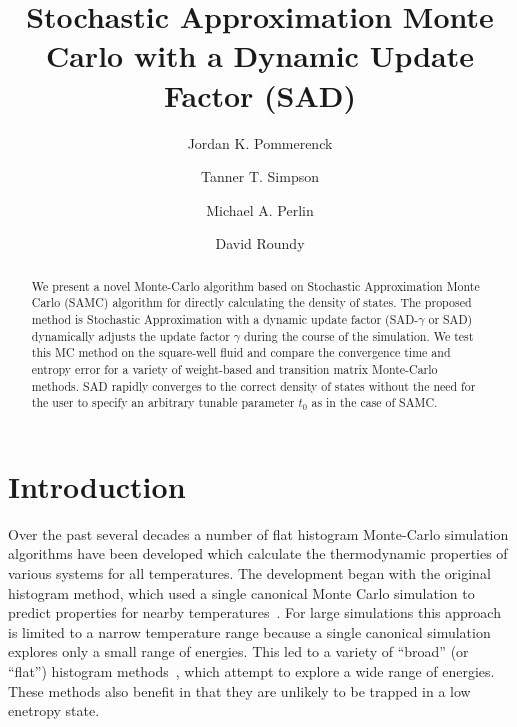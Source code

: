 \documentclass[letterpaper,twocolumn,amsmath,amssymb,pre,aps,10pt]{revtex4-1}
\begin{document}
\title{Stochastic Approximation Monte Carlo with a Dynamic Update
Factor (SAD)
}

\author{Jordan K. Pommerenck} \author{Tanner T. Simpson}
\author{Michael A. Perlin} \author{David Roundy}

\begin{abstract}
  We present a novel Monte-Carlo algorithm based on Stochastic
  Approximation Monte Carlo (SAMC) algorithm for directly calculating
  the density of states. The proposed method is Stochastic
  Approximation with a dynamic update factor (SAD-$\gamma$ or SAD)
  dynamically adjusts the update factor $\gamma$ during the course of
  the simulation. We test this MC method on the square-well fluid and
  compare the convergence time and entropy error for a variety of weight-based
  and transition matrix Monte-Carlo methods. SAD rapidly converges to the
  correct density of states without the need for the user to specify an
  arbitrary tunable parameter $t_0$ as in the case of SAMC.
\end{abstract}

\maketitle

\section{Introduction}
Over the past several decades a number of flat histogram Monte-Carlo
simulation algorithms have been developed which calculate the
thermodynamic properties of various systems for all temperatures.  The
development began with the original histogram method, which used a
single canonical Monte Carlo simulation to predict properties for
nearby temperatures~\cite{ferrenberg1988new}.  For large simulations
this approach is limited to a narrow temperature range because a single
canonical simulation explores only a small range of energies.  This led
to a variety of ``broad'' (or ``flat'') histogram
methods~\cite{penna1996broad, penna1998broad, swendsen1999transition,
wang2001determining, wang2001efficient, trebst2004optimizing}, which
attempt to explore a wide range of energies.  These methods also
benefit in that they are unlikely to be trapped in a low enetropy state.
\end{document}
